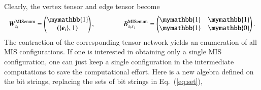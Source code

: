 \documentclass[onefignum, onetabnum]{siamart190516}
\newcommand{\<}{\langle}
\renewcommand{\>}{\rangle}
\newcommand{\Eq}[1]{Eq.~(\ref{#1})}
\begin{document}
Clearly, the vertex tensor and edge tensor become
\begin{equation}
    W_{s_i}^{\rm MISenum} = \left(\begin{matrix}
        \mymathbb{1} \\
        \left({\{\boldsymbol{e}_{i}\}, 1} \right)
    \end{matrix}\right),   
    \qquad \qquad
        B_{s_i s_j}^{\rm MISenum} = \left(\begin{matrix}
        \mymathbb{1}  & \mymathbb{1} \\
        \mymathbb{1} & \mymathbb{0}
    \end{matrix}\right).
\end{equation}
The contraction of the corresponding tensor network yields an enumeration of all MIS configurations. If one is interested in obtaining only a single MIS configuration, one can just keep a single configuration in the intermediate computations to save the computational effort. Here is a new algebra defined on the bit strings, replacing the sets of bit strings in \Eq{eq:set}, 
%
\end{document}
